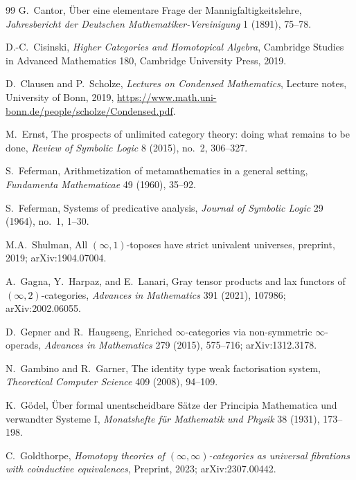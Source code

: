 \documentclass[11pt]{article}
\theoremstyle{plain}
\theoremstyle{definition}
\begin{document}
\begin{thebibliography}{99}
G.~Cantor,
\newblock \"Uber eine elementare Frage der Mannigfaltigkeitslehre,
\newblock \emph{Jahresbericht der Deutschen Mathematiker-Vereinigung} 1 (1891), 75--78.

D.-C.~Cisinski,
\newblock \emph{Higher Categories and Homotopical Algebra},
\newblock Cambridge Studies in Advanced Mathematics 180, Cambridge University Press, 2019.

D.~Clausen and P.~Scholze,
\newblock \emph{Lectures on Condensed Mathematics},
\newblock Lecture notes, University of Bonn, 2019,
\newblock \url{https://www.math.uni-bonn.de/people/scholze/Condensed.pdf}.

M.~Ernst,
\newblock The prospects of unlimited category theory: doing what remains to be done,
\newblock \emph{Review of Symbolic Logic} 8 (2015), no.~2, 306--327.

S.~Feferman,
\newblock Arithmetization of metamathematics in a general setting,
\newblock \emph{Fundamenta Mathematicae} 49 (1960), 35--92.

S.~Feferman,
\newblock Systems of predicative analysis,
\newblock \emph{Journal of Symbolic Logic} 29 (1964), no.~1, 1--30.

M.A.~Shulman,
\newblock All $(\infty, 1)$-toposes have strict univalent universes,
\newblock preprint, 2019; arXiv:1904.07004.

A.~Gagna, Y.~Harpaz, and E.~Lanari,
\newblock Gray tensor products and lax functors of $(\infty, 2)$-categories,
\newblock \emph{Advances in Mathematics} 391 (2021), 107986; arXiv:2002.06055.

D.~Gepner and R.~Haugseng,
\newblock Enriched $\infty$-categories via non-symmetric $\infty$-operads,
\newblock \emph{Advances in Mathematics} 279 (2015), 575--716; arXiv:1312.3178.

N.~Gambino and R.~Garner,
\newblock The identity type weak factorisation system,
\newblock \emph{Theoretical Computer Science} 409 (2008), 94--109.

K.~G\"odel,
\newblock \"Uber formal unentscheidbare S\"atze der Principia Mathematica und verwandter Systeme I,
\newblock \emph{Monatshefte f\"ur Mathematik und Physik} 38 (1931), 173--198.

C.~Goldthorpe,
\newblock \emph{Homotopy theories of $(\infty, \infty)$-categories as universal fibrations with coinductive equivalences},
\newblock Preprint, 2023; arXiv:2307.00442.


\end{thebibliography}
\end{document}
